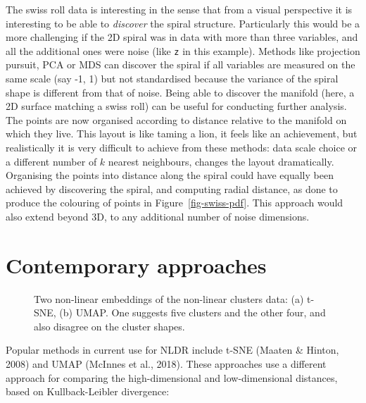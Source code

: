 \documentclass[
  letterpaper,
]{krantz}
\begin{document}
The swiss roll data is interesting in the sense that from a visual
perspective it is interesting to be able to \emph{discover} the spiral
structure. Particularly this would be a more challenging if the 2D
spiral was in data with more than three variables, and all the
additional ones were noise (like \texttt{z} in this example). Methods
like projection pursuit, PCA or MDS can discover the spiral if all
variables are measured on the same scale (say -1, 1) but not
standardised because the variance of the spiral shape is different from
that of noise. Being able to discover the manifold (here, a 2D surface
matching a swiss roll) can be useful for conducting further analysis.
The points are now organised according to distance relative to the
manifold on which they live. This layout is like taming a lion, it feels
like an achievement, but realistically it is very difficult to achieve
from these methods: data scale choice or a different number of \(k\)
nearest neighbours, changes the layout dramatically. Organising the
points into distance along the spiral could have equally been achieved
by discovering the spiral, and computing radial distance, as done to
produce the colouring of points in Figure~\ref{fig-swiss-pdf}. This
approach would also extend beyond 3D, to any additional number of noise
dimensions.

\section{Contemporary approaches}\label{contemporary-approaches}

 

\begin{figure}


\caption{\label{fig-nldr-clusters}Two non-linear embeddings of the
non-linear clusters data: (a) t-SNE, (b) UMAP. One suggests five
clusters and the other four, and also disagree on the cluster shapes.}

\end{figure}%

Popular methods in current use for NLDR include t-SNE (Maaten \& Hinton,
2008) and UMAP (McInnes et al., 2018). These approaches use a different
approach for comparing the high-dimensional and low-dimensional
distances, based on Kullback-Leibler divergence:
\end{document}
